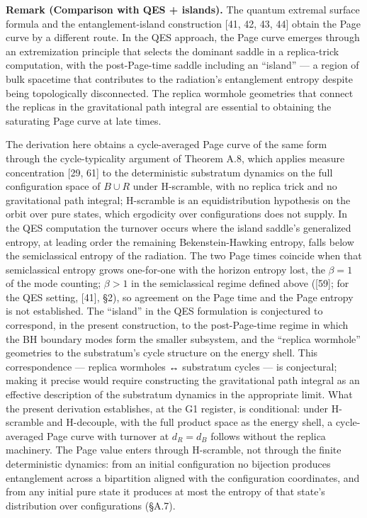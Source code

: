 \documentclass[
]{article}
\begin{document}
\textbf{Remark (Comparison with QES + islands).} The quantum extremal
surface formula and the entanglement-island construction {[}41, 42, 43,
44{]} obtain the Page curve by a different route. In the QES approach,
the Page curve emerges through an extremization principle that selects
the dominant saddle in a replica-trick computation, with the
post-Page-time saddle including an ``island'' --- a region of bulk
spacetime that contributes to the radiation's entanglement entropy
despite being topologically disconnected. The replica wormhole
geometries that connect the replicas in the gravitational path integral
are essential to obtaining the saturating Page curve at late times.

The derivation here obtains a cycle-averaged Page curve of the same form
through the cycle-typicality argument of Theorem A.8, which applies
measure concentration {[}29, 61{]} to the deterministic substratum
dynamics on the full configuration space of \(B \cup R\) under
H-scramble, with no replica trick and no gravitational path integral;
H-scramble is an equidistribution hypothesis on the orbit over pure
states, which ergodicity over configurations does not supply. In the QES
computation the turnover occurs where the island saddle's generalized
entropy, at leading order the remaining Bekenstein-Hawking entropy,
falls below the semiclassical entropy of the radiation. The two Page
times coincide when that semiclassical entropy grows one-for-one with
the horizon entropy lost, the \(\beta = 1\) of the mode counting;
\(\beta > 1\) in the semiclassical regime defined above ({[}59{]}; for
the QES setting, {[}41{]}, §2), so agreement on the Page time and the
Page entropy is not established. The ``island'' in the QES formulation
is conjectured to correspond, in the present construction, to the
post-Page-time regime in which the BH boundary modes form the smaller
subsystem, and the ``replica wormhole'' geometries to the substratum's
cycle structure on the energy shell. This correspondence --- replica
wormholes ↔ substratum cycles --- is conjectural; making it precise
would require constructing the gravitational path integral as an
effective description of the substratum dynamics in the appropriate
limit. What the present derivation establishes, at the G1 register, is
conditional: under H-scramble and H-decouple, with the full product
space as the energy shell, a cycle-averaged Page curve with turnover at
\(d_R = d_B\) follows without the replica machinery. The Page value
enters through H-scramble, not through the finite deterministic
dynamics: from an initial configuration no bijection produces
entanglement across a bipartition aligned with the configuration
coordinates, and from any initial pure state it produces at most the
entropy of that state's distribution over configurations (§A.7).
\end{document}

